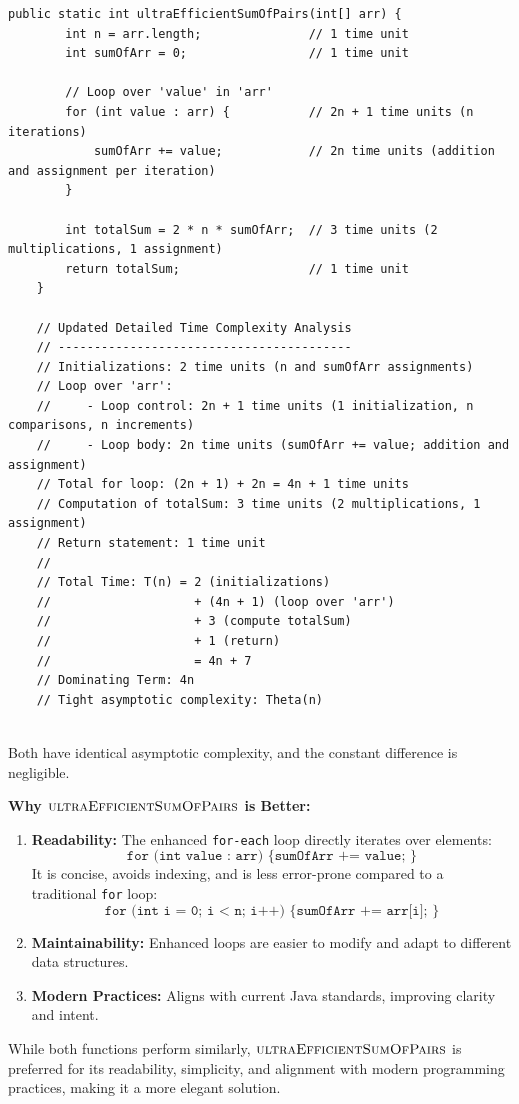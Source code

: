 \begin{lstlisting}[style = javaStyle, caption={Ultra Efficient Sum of Pairs with Analysis}, label={lst:java_ultra_efficient_sum_pairs_analysis}]
    public static int ultraEfficientSumOfPairs(int[] arr) {
        int n = arr.length;               // 1 time unit
        int sumOfArr = 0;                 // 1 time unit
    
        // Loop over 'value' in 'arr'
        for (int value : arr) {           // 2n + 1 time units (n iterations)
            sumOfArr += value;            // 2n time units (addition and assignment per iteration)
        }
    
        int totalSum = 2 * n * sumOfArr;  // 3 time units (2 multiplications, 1 assignment)
        return totalSum;                  // 1 time unit
    }
    
    // Updated Detailed Time Complexity Analysis
    // -----------------------------------------
    // Initializations: 2 time units (n and sumOfArr assignments)
    // Loop over 'arr':
    //     - Loop control: 2n + 1 time units (1 initialization, n comparisons, n increments)
    //     - Loop body: 2n time units (sumOfArr += value; addition and assignment)
    // Total for loop: (2n + 1) + 2n = 4n + 1 time units
    // Computation of totalSum: 3 time units (2 multiplications, 1 assignment)
    // Return statement: 1 time unit
    //
    // Total Time: T(n) = 2 (initializations)
    //                    + (4n + 1) (loop over 'arr')
    //                    + 3 (compute totalSum)
    //                    + 1 (return)
    //                    = 4n + 7
    // Dominating Term: 4n
    // Tight asymptotic complexity: Theta(n)
    
\end{lstlisting}  


Both have identical asymptotic complexity, and the constant difference is negligible.

\textbf{Why $\proc{ultraEfficientSumOfPairs}$ is Better:}
\begin{enumerate}
    \item \textbf{Readability:} The enhanced \texttt{for-each} loop directly iterates over elements:
    \[
    \texttt{for (int value : arr) \{ sumOfArr += value; \}}
    \]
    It is concise, avoids indexing, and is less error-prone compared to a traditional \texttt{for} loop:
    \[
    \texttt{for (int i = 0; i < n; i++) \{ sumOfArr += arr[i]; \}}
    \]
    \item \textbf{Maintainability:} Enhanced loops are easier to modify and adapt to different data structures.
    \item \textbf{Modern Practices:} Aligns with current Java standards, improving clarity and intent.
\end{enumerate}

While both functions perform similarly, $\proc{ultraEfficientSumOfPairs}$ is preferred for its readability, simplicity, and alignment with modern programming practices, making it a more elegant solution.

